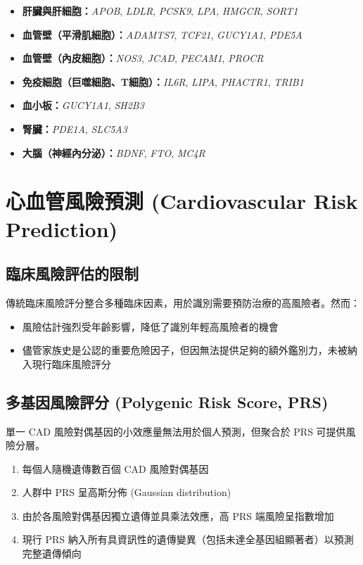 \documentclass[12pt,a4paper]{article}
\begin{document}
\begin{itemize}
    \item \textbf{肝臟與肝細胞：}\textit{APOB}, \textit{LDLR}, \textit{PCSK9}, \textit{LPA}, \textit{HMGCR}, \textit{SORT1}
    \item \textbf{血管壁（平滑肌細胞）：}\textit{ADAMTS7}, \textit{TCF21}, \textit{GUCY1A1}, \textit{PDE5A}
    \item \textbf{血管壁（內皮細胞）：}\textit{NOS3}, \textit{JCAD}, \textit{PECAM1}, \textit{PROCR}
    \item \textbf{免疫細胞（巨噬細胞、T細胞）：}\textit{IL6R}, \textit{LIPA}, \textit{PHACTR1}, \textit{TRIB1}
    \item \textbf{血小板：}\textit{GUCY1A1}, \textit{SH2B3}
    \item \textbf{腎臟：}\textit{PDE1A}, \textit{SLC5A3}
    \item \textbf{大腦（神經內分泌）：}\textit{BDNF}, \textit{FTO}, \textit{MC4R}
\end{itemize}

\section{心血管風險預測 (Cardiovascular Risk Prediction)}

\subsection{臨床風險評估的限制}

傳統臨床風險評分整合多種臨床因素，用於識別需要預防治療的高風險者。然而：

\begin{itemize}
    \item 風險估計強烈受年齡影響，降低了識別年輕高風險者的機會
    \item 儘管家族史是公認的重要危險因子，但因無法提供足夠的額外鑑別力，未被納入現行臨床風險評分
\end{itemize}

\subsection{多基因風險評分 (Polygenic Risk Score, PRS)}

單一 CAD 風險對偶基因的小效應量無法用於個人預測，但聚合於 PRS 可提供風險分層。

\begin{tcolorbox}[
    colback=emergency_blue!5!white,
    colframe=emergency_blue,
    title=\textbf{PRS 的核心概念},
    fonttitle=\bfseries
]
\begin{enumerate}
    \item 每個人隨機遺傳數百個 CAD 風險對偶基因
    \item 人群中 PRS 呈高斯分佈 (Gaussian distribution)
    \item 由於各風險對偶基因獨立遺傳並具乘法效應，高 PRS 端風險呈指數增加
    \item 現行 PRS 納入所有具資訊性的遺傳變異（包括未達全基因組顯著者）以預測完整遺傳傾向
\end{enumerate}
\end{tcolorbox}
\end{document}
